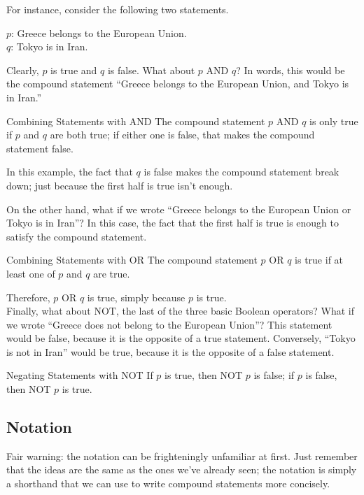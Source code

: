 For instance, consider the following two statements.
\begin{center}
$p$: Greece belongs to the European Union.\\
$q$: Tokyo is in Iran.
\end{center}

Clearly, $p$ is true and $q$ is false.  What about $p$ AND $q$?  In words, this would be the compound statement ``Greece belongs to the European Union, and Tokyo is in Iran.''  

\begin{proc}{Combining Statements with AND}
The compound statement $p$ AND $q$ is only true if $p$ and $q$ are both true; if either one is false, that makes the compound statement false.
\end{proc}

In this example, the fact that $q$ is false makes the compound statement break down; just because the first half is true isn't enough.

On the other hand, what if we wrote ``Greece belongs to the European Union or Tokyo is in Iran''?  In this case, the fact that the first half is true is enough to satisfy the compound statement.

\begin{proc}{Combining Statements with OR}
The compound statement $p$ OR $q$ is true if at least one of $p$ and $q$ are true.
\end{proc}

Therefore, $p$ OR $q$ is true, simply because $p$ is true.\\

Finally, what about NOT, the last of the three basic Boolean operators?  What if we wrote ``Greece does not belong to the European Union''?  This statement would be false, because it is the opposite of a true statement.  Conversely, ``Tokyo is not in Iran'' would be true, because it is the opposite of a false statement.

\begin{proc}{Negating Statements with NOT}
If $p$ is true, then NOT $p$ is false; if $p$ is false, then NOT $p$ is true.
\end{proc}

\subsection{Notation}
Fair warning: the notation can be frighteningly unfamiliar at first.  Just remember that the ideas are the same as the ones we've already seen; the notation is simply a shorthand that we can use to write compound statements more concisely.

